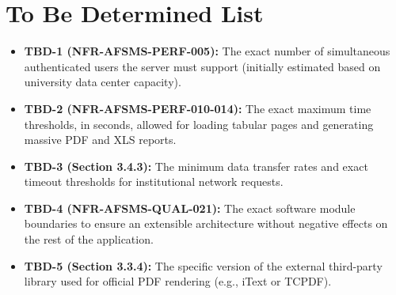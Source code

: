 \documentclass[11pt, a4paper]{article}
\begin{document}
\section{To Be Determined List}
\begin{itemize}
    \item \textbf{TBD-1 (NFR-AFSMS-PERF-005):} The exact number of simultaneous authenticated users the server must support (initially estimated based on university data center capacity).
    \item \textbf{TBD-2 (NFR-AFSMS-PERF-010-014):} The exact maximum time thresholds, in seconds, allowed for loading tabular pages and generating massive PDF and XLS reports.
    \item \textbf{TBD-3 (Section 3.4.3):} The minimum data transfer rates and exact timeout thresholds for institutional network requests.
    \item \textbf{TBD-4 (NFR-AFSMS-QUAL-021):} The exact software module boundaries to ensure an extensible architecture without negative effects on the rest of the application.
    \item \textbf{TBD-5 (Section 3.3.4):} The specific version of the external third-party library used for official PDF rendering (e.g., iText or TCPDF).
\end{itemize}
\end{document}
